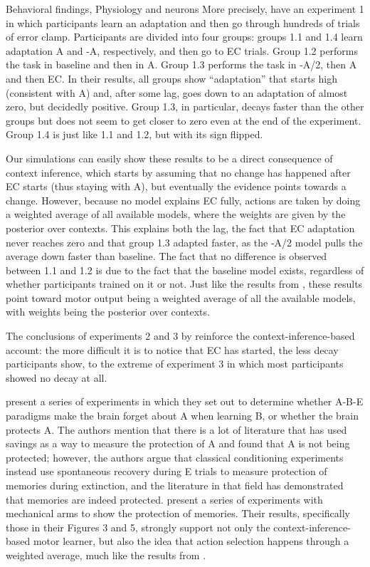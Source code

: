 \documentclass{report}
\begin{document}
\begin{chapter}{Behavioral findings, Physiology and neurons}
More precisely, \cite{Vaswani_Decay_2013} have an experiment 1 in which
participants learn an adaptation and then go through hundreds of trials of
error clamp. Participants are divided into four groups: groups 1.1 and 1.4
learn adaptation A and -A, respectively, and then go to EC trials. Group 1.2
performs the task in baseline and then in A. Group 1.3 performs the task in
-A/2, then A and then EC. In their results, all groups show ``adaptation'' that
starts high (consistent with A) and, after some lag, goes down to an adaptation
of almost zero, but decidedly positive. Group 1.3, in particular, decays faster
than the other groups but does not seem to get closer to zero even at the end
of the experiment. Group 1.4 is just like 1.1 and 1.2, but with its sign
flipped.

Our simulations can easily show these results to be a direct consequence of
context inference, which starts by assuming that no change has happened after
EC starts (thus staying with A), but eventually the evidence points towards a
change. However, because no model explains EC fully, actions are taken by doing
a weighted average of all available models, where the weights are given by the
posterior over contexts. This explains both the lag, the fact that EC
adaptation never reaches zero and that group 1.3 adapted faster, as the -A/2
model pulls the average down faster than baseline. The fact that no difference
is observed between 1.1 and 1.2 is due to the fact that the baseline model
exists, regardless of whether participants trained on it or not. Just like the
results from \cite{Davidson_Scaling_2004}, these results point toward motor
output being a weighted average of all the available models, with weights being
the posterior over contexts.

The conclusions of experiments 2 and 3 by \cite{Vaswani_Decay_2013} reinforce
the context-inference-based account: the more difficult it is to notice that EC
has started, the less decay participants show, to the extreme of experiment 3
in which most participants showed no decay at all.

\cite{Pekny_Protection_2011} present a series of experiments in which they set
out to determine whether A-B-E paradigms make the brain forget about A when
learning B, or whether the brain protects A. The authors mention that there is
a lot of literature that has used savings as a way to measure the protection of
A and found that A is not being protected; however, the authors argue that
classical conditioning experiments instead use spontaneous recovery during E
trials to measure protection of memories during extinction, and the literature
in that field has demonstrated that memories are indeed
protected. \cite{Pekny_Protection_2011} present a series of experiments with
mechanical arms to show the protection of memories. Their results, specifically
those in their Figures 3 and 5, strongly support not only the
context-inference-based motor learner, but also the idea that action selection
happens through a weighted average, much like the results from
\cite{Herzfeld_memory_2014}.


\end{chapter}
\end{document}
